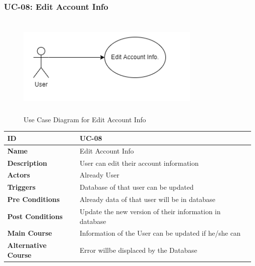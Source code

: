 \subsubsection{UC-08: Edit Account Info}
\begin{figure}[H]
    \includegraphics[height=5cm, width=0.8\textwidth]{./diagrams/Use Case/u8.png}
    \centering
    \caption{Use Case Diagram for Edit Account Info}
    \label{fig:Usecase1}
\end{figure}

\begin{center}
    \begin{tabularx}{\textwidth}{|l|X|}
        \hline
        \textbf{ID}                 & UC-08                                                   \\
        \hline
        \textbf{Name}               & Edit Account Info                                       \\
        \hline
        \textbf{Description}        & User can edit their account information                 \\
        \hline
        \textbf{Actors}             & Already User                                            \\
        \hline
        \textbf{Triggers}           & Database of that user can be updated                    \\
        \hline
        \textbf{Pre Conditions}     & Already data of that user will be in database           \\
        \hline
        \textbf{Post Conditions}    & Update the new version of their information in database \\
        \hline
        \textbf{Main Course}        & Information of the User can be updated if he/she can    \\
        \hline
        \textbf{Alternative Course} & Error willbe displaced by the Database                  \\
        \hline
    \end{tabularx}
\end{center}
\newpage


